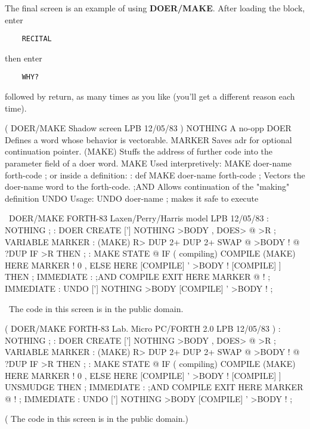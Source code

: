 The final screen is an example of using {\bf DOER/MAKE}.  After loading 
the block, enter
\begin{verbatim}
    RECITAL
\end{verbatim}
then enter 
\begin{verbatim}
    WHY?
\end{verbatim}
followed by return, as many times as you like (you'll get a different
reason each time).

\setcounter{screen}{21}
\begin{Screen}
( DOER/MAKE   Shadow screen                      LPB 12/05/83 )
NOTHING   A no-opp
DOER      Defines a word whose behavior is vectorable.
MARKER    Saves adr for optional continuation pointer.
(MAKE)    Stuffs the address of further code into the
          parameter field of a doer word.
MAKE      Used interpretively:  MAKE doer-name  forth-code ;
          or inside a definition:
             : def   MAKE doer-name  forth-code ;
          Vectors the doer-name word to the forth-code.
;AND      Allows continuation of the "making" definition
UNDO      Usage:  UNDO doer-name ; makes it safe to execute




\end{Screen}
\vfill
\begin{Screen}
\ DOER/MAKE   FORTH-83 Laxen/Perry/Harris model  LPB 12/05/83 
: NOTHING ;
: DOER   CREATE  ['] NOTHING  >BODY ,  DOES> @ >R ;
VARIABLE MARKER
: (MAKE)  R>  DUP 2+  DUP 2+  SWAP @  >BODY !
   @ ?DUP IF >R THEN ;
: MAKE   STATE @ IF ( compiling)
   COMPILE (MAKE)  HERE MARKER !  0 ,
   ELSE  HERE  [COMPILE] '  >BODY !
   [COMPILE] ]  THEN ;   IMMEDIATE
: ;AND   COMPILE EXIT  HERE MARKER @ ! ;   IMMEDIATE
: UNDO   ['] NOTHING  >BODY  [COMPILE] '  >BODY ! ;

\ The code in this screen is in the public domain.


\end{Screen}
\vfill
\begin{Screen}
( DOER/MAKE   FORTH-83 Lab. Micro PC/FORTH 2.0   LPB 12/05/83 )
: NOTHING ;
: DOER   CREATE  ['] NOTHING  >BODY ,  DOES> @ >R ;
VARIABLE MARKER
: (MAKE)  R>  DUP 2+  DUP 2+  SWAP @  >BODY !
   @ ?DUP IF >R THEN ;
: MAKE   STATE @ IF ( compiling)
   COMPILE (MAKE)  HERE MARKER !  0 ,
   ELSE  HERE  [COMPILE] '  >BODY !
   [COMPILE] ] UNSMUDGE  THEN ;   IMMEDIATE
: ;AND   COMPILE EXIT  HERE MARKER @ ! ;   IMMEDIATE
: UNDO   ['] NOTHING  >BODY  [COMPILE] '  >BODY ! ;

( The code in this screen is in the public domain.)


\end{Screen}
